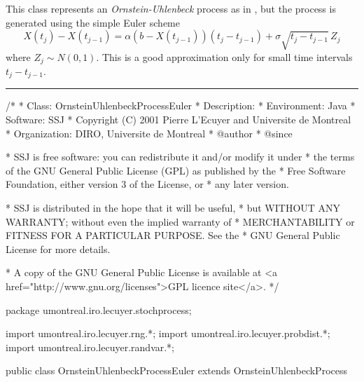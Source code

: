 
This class represents an \emph{Ornstein-Uhlenbeck} process
as in , but
the process is generated using the simple Euler scheme
\begin{equation}
   X(t_j) - X(t_{j-1}) = \alpha(b - X(t_{j-1}))(t_j - t_{j-1}) +
      \sigma \sqrt{t_j - t_{j-1}}\, Z_j
                                    \label{eq:ornstein-seqEuler}
\end{equation}
where $Z_j \sim N(0,1)$.
This is a good approximation only for small time intervals $t_j - t_{j-1}$.

\bigskip\hrule\bigskip

\begin{code}
\begin{hide}
/*
 * Class:        OrnsteinUhlenbeckProcessEuler
 * Description:  
 * Environment:  Java
 * Software:     SSJ 
 * Copyright (C) 2001  Pierre L'Ecuyer and Universite de Montreal
 * Organization: DIRO, Universite de Montreal
 * @author       
 * @since

 * SSJ is free software: you can redistribute it and/or modify it under
 * the terms of the GNU General Public License (GPL) as published by the
 * Free Software Foundation, either version 3 of the License, or
 * any later version.

 * SSJ is distributed in the hope that it will be useful,
 * but WITHOUT ANY WARRANTY; without even the implied warranty of
 * MERCHANTABILITY or FITNESS FOR A PARTICULAR PURPOSE.  See the
 * GNU General Public License for more details.

 * A copy of the GNU General Public License is available at
   <a href="http://www.gnu.org/licenses">GPL licence site</a>.
 */
\end{hide}
package umontreal.iro.lecuyer.stochprocess;\begin{hide}
import umontreal.iro.lecuyer.rng.*;
import umontreal.iro.lecuyer.probdist.*;
import umontreal.iro.lecuyer.randvar.*;

\end{hide}

public class OrnsteinUhlenbeckProcessEuler extends OrnsteinUhlenbeckProcess\begin{hide} {
\end{hide}
\end{code}
